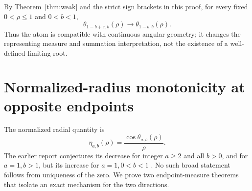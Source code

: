 \documentclass[11pt]{article}
\numberwithin{equation}{section}
\theoremstyle{definition}\newtheorem{definition}[theorem]{Definition}
\theoremstyle{remark}\newtheorem{remark}[theorem]{Remark}
\begin{document}
By Theorem~\ref{thm:weak} and the strict sign brackets in this proof,
for every fixed $0<\rho\le1$ and $0<b<1$,
\[
 \theta_{1-b+\varepsilon,b}(\rho)
 \longrightarrow\theta_{1-b,b}(\rho).
\]
Thus the atom is compatible with continuous angular geometry; it
changes the representing measure and summation interpretation, not the
existence of a well-defined limiting root.

\section{Normalized-radius monotonicity at opposite endpoints}
\label{sec:radius}

The normalized radial quantity is
\begin{equation}\label{eq:eta}
 \eta_{a,b}(\rho)=\frac{\cos\theta_{a,b}(\rho)}{\rho}.
\end{equation}
The earlier report conjectures its decrease for integer $a\ge2$ and
all $b>0$, and for $a=1,b>1$, but its increase for $a=1,0<b<1$
\cite[Conjecture ``Normalized-radius monotonicity'']{angular}.
No such broad statement follows from uniqueness of the zero.
We prove two endpoint-measure theorems that isolate an exact
mechanism for the two directions.
\end{document}
